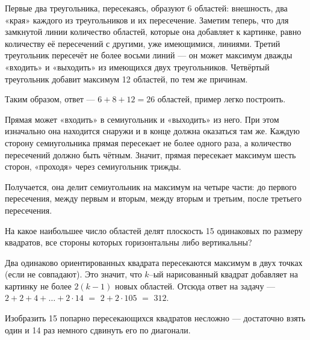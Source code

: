 \begin{itemize}

\itA Первые два треугольника, пересекаясь, образуют 6 областей: внешность, два «края» каждого из треугольников и их пересечение. Заметим теперь, что для замкнутой линии количество областей, которые она добавляет к картинке, равно количеству её пересечений с другими, уже имеющимися, линиями. Третий треугольник пересечёт не более восьми линий — он может максимум дважды «входить» и «выходить» из имеющихся двух треугольников. Четвёртый треугольник добавит максимум 12 областей, по тем же причинам.

Таким образом, ответ — $6+8+12=26$ областей, пример легко построить.

\itB Прямая может «входить» в семиугольник и «выходить» из него. При этом изначально она находится снаружи и в конце должна оказаться там же. Каждую сторону семиугольника прямая пересекает не более одного раза, а количество пересечений должно быть чётным. Значит, прямая пересекает максимум шесть сторон, «проходя» через семиугольник трижды.

Получается, она делит семиугольник на максимум на четыре части: до первого пересечения, между первым и вторым, между вторым и третьим, после третьего пересечения.

\itC На какое наибольшее число областей делят плоскость 15 одинаковых по размеру квадратов, все стороны которых горизонтальны либо вертикальны?

Два одинаково ориентированных квадрата пересекаются максимум в двух точках (если не совпадают). Это значит, что $k$--ый нарисованный квадрат добавляет на картинку не более $2(k-1)$ новых областей. Отсюда ответ на задачу — $2+2+4+\ldots+2\cdot 14$ $=$ $2+2\cdot105$ $=$ $312$.

Изобразить 15 попарно пересекающихся квадратов несложно — достаточно взять один и 14 раз немного сдвинуть его по диагонали.
\end{itemize}